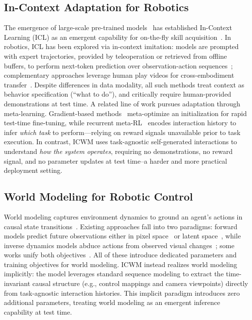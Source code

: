 \documentclass{llmxive}
\begin{document}
\subsection{In-Context Adaptation for Robotics}
The emergence of large-scale pre-trained models~\cite{Radford2019LanguageMA,Touvron2023LLaMAOA,OpenAI2022ChatGPT} has established In-Context Learning (ICL) as an emergent capability for on-the-fly skill acquisition~\cite{Brown2020LanguageMA,Dong2022ASO}. In robotics, ICL has been explored via in-context imitation: models are prompted with expert trajectories, provided by teleoperation or retrieved from offline buffers, to perform next-token prediction over observation-action sequences~\cite{Fu2024ICRTII,An2025ActionTM,Sridhar2025RICLAI}; complementary approaches leverage human play videos for cross-embodiment transfer~\cite{Shah2025MimicDroidIL,Jain2024Vid2RobotEV}. Despite differences in data modality, all such methods treat context as behavior specification (``what to do''), and critically require human-provided demonstrations at test time. 
A related line of work pursues adaptation through meta-learning. Gradient-based methods~\cite{MAML2017,Liu2019MetaLearningWI} meta-optimize an initialization for rapid test-time fine-tuning, while recurrent meta-RL~\cite{Duan2016RL2FR, Zintgraf2020VariBADAV} encodes interaction history 
to infer \textit{which task} to perform—relying on reward signals unavailable prior to task execution. 
In contrast, ICWM uses task-agnostic self-generated interactions to understand \textit{how the system operates}, requiring no demonstrations, no reward signal, and no parameter updates at test time--a harder and more practical deployment setting.




\subsection{World Modeling for Robotic Control}
World modeling captures environment dynamics to ground an agent's actions in causal state transitions~\cite{Ha2018RecurrentWM,LeCun2022APT, Ding2024UnderstandingWO,wang2025world,wang2026world}. Existing approaches fall into two paradigms: forward models predict future observations either in pixel space~\cite{GR-1, Li2024GRMGLP,Zhao2025CoTVLAVC,Cen2025WorldVLATA} or latent space~\cite{Hafner2019DreamTC,Hafner2020MasteringAW,Wu2022DayDreamerWM, Hafner2023MasteringDD,Zheng2025FLARERL}, while inverse dynamics models abduce actions from observed visual changes~\cite{Du2023LearningUP,Jang2025DreamGenUG,Tian2024PredictiveID,Baker2022VideoP}; some works unify both objectives~\cite{Zhu2025UnifiedWM,Li2025UnifiedVA}. All of these introduce dedicated parameters and training objectives for world modeling. ICWM instead realizes world modeling implicitly: 
the model leverages standard sequence modeling to extract the time-invariant causal structure (e.g., control mappings and camera viewpoints) directly from task-agnostic interaction histories. 
This implicit paradigm introduces zero additional parameters, treating world modeling as an emergent inference capability at test time.
\end{document}
